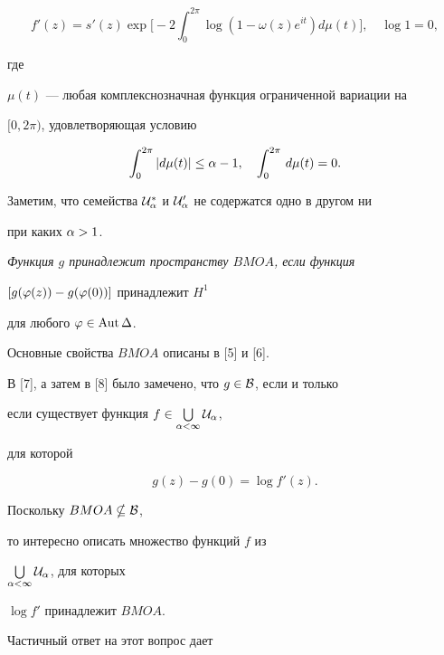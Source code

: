 \begin{equation}


f'(z)=s'(z)\exp\bigg[-2\int_0^{2\pi}\log (1-\omega(z)e^{it})d\mu(t)\bigg],


\quad \log 1=0,


\end{equation}


где


$\mu(t)$ --- любая комплекснозначная функция ограниченной вариации на


$[0,2\pi)$, удовлетворяющая условию


\begin{equation}


\int_0^{2\pi}|d\mu(t)|\leq\al-1,\quad \int_0^{2\pi}\, d\mu(t)=0.


\end{equation}


Заметим, что семейства $\cal U_\alpha^\ast$ и $\cal U_\alpha'$ не содержатся одно в другом ни


при каких $\alpha>1$.





{\it Функция $g$ принадлежит пространству $BMOA$, если функция


$[g(\varphi(z))-g(\varphi(0))]$ принадлежит $H^1$


для любого $\varphi\in \operatorname{Aut} \Delta$.}


Основные свойства $BMOA$ описаны в [5] и [6].


В [7], а затем в [8] было замечено, что $g\in\cal B$, если и только


если существует функция $f\in\bigcup\limits_{\alpha<\infty}\cal U_\alpha$,


для которой


\begin{equation*}


g(z)-g(0) =\log f'(z).


\end{equation*}





Поскольку $BMOA\nsubseteq {\cal B}$,


то интересно описать множество функций $f$ из


$\bigcup\limits_{\alpha<\infty}\cal U_\alpha$, для которых


$\log f'$ принадлежит $BMOA$.


Частичный ответ на этот вопрос дает





